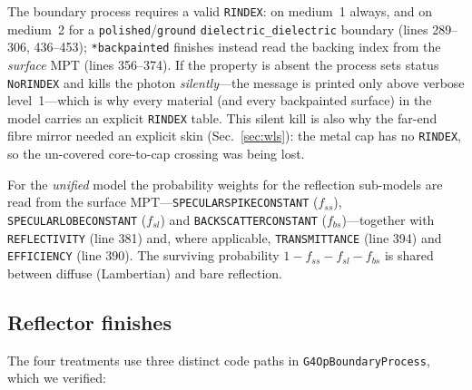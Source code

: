 \documentclass[11pt,a4paper]{article}
\begin{document}
The boundary process requires a valid \texttt{RINDEX}: on medium~1 always, and
on medium~2 for a \texttt{polished}/\texttt{ground}
\texttt{dielectric\_dielectric} boundary (lines 289--306, 436--453);
\texttt{*backpainted} finishes instead read the backing index from the
\emph{surface} MPT (lines 356--374). If the property is absent the process sets
status \texttt{NoRINDEX} and kills the photon \emph{silently}---the message is
printed only above verbose level~1---which is why every material (and every
backpainted surface) in the model carries an explicit \texttt{RINDEX} table.
This silent kill is also why the far-end fibre mirror needed an explicit skin
(Sec.~\ref{sec:wls}): the metal cap has no \texttt{RINDEX}, so the un-covered
core-to-cap crossing was being lost.

For the \emph{unified} model the probability weights for the reflection
sub-models are read from the surface MPT---\texttt{SPECULARSPIKECONSTANT}
($f_{ss}$), \texttt{SPECULARLOBECONSTANT} ($f_{sl}$) and
\texttt{BACKSCATTERCONSTANT} ($f_{bs}$)---together with \texttt{REFLECTIVITY}
(line 381) and, where applicable, \texttt{TRANSMITTANCE} (line 394) and
\texttt{EFFICIENCY} (line 390). The surviving probability
$1 - f_{ss} - f_{sl} - f_{bs}$ is shared between diffuse (Lambertian) and bare
reflection.

\subsection{Reflector finishes}

The four treatments use three distinct code paths in
\texttt{G4OpBoundaryProcess}, which we verified:
\end{document}
